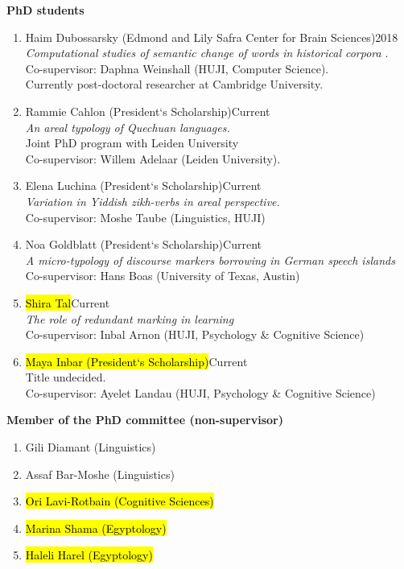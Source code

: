 \documentclass[letterpaper,11pt]{article}
\begin{document}
\begin{flushleft}\textbf{PhD students}
\end{flushleft}
\begin{enumerate}
\item {Haim Dubossarsky (Edmond and Lily Safra Center for Brain Sciences)}\hfill{2018}\\
\textit{Computational studies of semantic change of words in historical corpora} .\\ 
Co-supervisor: Daphna Weinshall (HUJI, Computer Science).\\Currently post-doctoral researcher at Cambridge University.
\item Rammie Cahlon (President`s Scholarship)\hfill{Current}\\
\textit{An areal typology of Quechuan languages.}\\{Joint PhD program with Leiden University}\\ Co-supervisor: Willem Adelaar (Leiden University).
\item Elena Luchina (President`s Scholarship)\hfill{Current}\\\textit{Variation in Yiddish zikh-verbs in areal perspective.}\\Co-supervisor: Moshe Taube (Linguistics, HUJI)
\item Noa Goldblatt (President`s Scholarship)\hfill{Current}\\\textit{A micro-typology of discourse markers borrowing in German speech islands }\\Co-supervisor: Hans Boas (University of Texas, Austin)
\item \hl{Shira Tal}\hfill{Current}\\\textit{The role of redundant marking in learning}\\Co-supervisor: Inbal Arnon (HUJI, Psychology \& Cognitive Science)
\item \hl{Maya Inbar (President`s Scholarship)}\hfill{Current}\\Title undecided.\\Co-supervisor: Ayelet Landau (HUJI, Psychology \& Cognitive Science)
\end{enumerate}

\begin{flushleft}\textbf{Member of the PhD committee (non-supervisor)}
\begin{enumerate}
\item Gili Diamant (Linguistics)
\item Assaf Bar-Moshe (Linguistics)
\item \hl{Ori Lavi-Rotbain (Cognitive Sciences)}
\item \hl{Marina Shama (Egyptology)}
\item \hl{Haleli Harel (Egyptology)}

\end{enumerate}
\end{flushleft}
\end{document}
